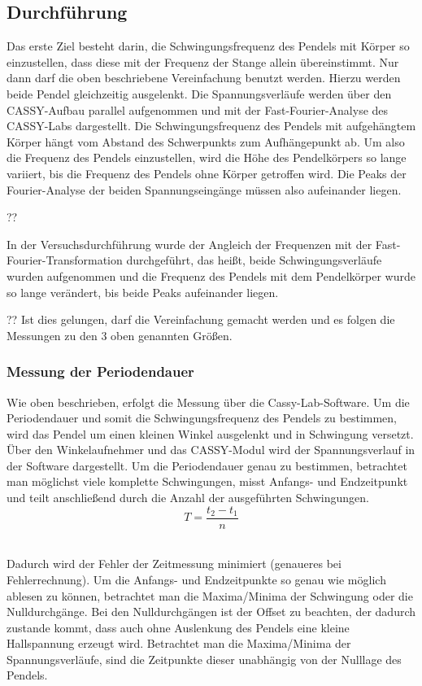 \documentclass[a4paper, 11pt]{article}
\begin{document}
\subsection{Durchführung}
Das erste Ziel besteht darin, die Schwingungsfrequenz des Pendels mit Körper so einzustellen, dass diese mit der Frequenz der Stange allein übereinstimmt. Nur dann darf die oben beschriebene Vereinfachung benutzt werden.
Hierzu werden beide Pendel gleichzeitig ausgelenkt. Die Spannungsverläufe werden über den CASSY-Aufbau parallel aufgenommen und mit der Fast-Fourier-Analyse des CASSY-Labs dargestellt. Die Schwingungsfrequenz des Pendels mit aufgehängtem Körper hängt vom Abstand des Schwerpunkts zum Aufhängepunkt ab. Um also die Frequenz des Pendels einzustellen, wird die Höhe des Pendelkörpers so lange variiert, bis die Frequenz des Pendels ohne Körper getroffen wird. Die Peaks der Fourier-Analyse der beiden Spannungseingänge müssen also aufeinander liegen. 

??

In der Versuchsdurchführung wurde der Angleich der Frequenzen mit der Fast-Fourier-Transformation durchgeführt, das heißt, beide Schwingungsverläufe wurden aufgenommen und die Frequenz des Pendels mit dem Pendelkörper wurde so lange verändert, bis beide Peaks aufeinander liegen. 

??
Ist dies gelungen, darf die Vereinfachung gemacht werden und es folgen die Messungen zu den 3 oben genannten Größen.
\newpage

\subsubsection{Messung der Periodendauer}
Wie oben beschrieben, erfolgt die Messung über die Cassy-Lab-Software. Um die Periodendauer und somit die Schwingungsfrequenz des Pendels zu bestimmen, wird das Pendel um einen kleinen Winkel ausgelenkt und in Schwingung versetzt. Über den Winkelaufnehmer und das CASSY-Modul wird der Spannungsverlauf in der Software dargestellt. Um die Periodendauer genau zu bestimmen, betrachtet man möglichst viele komplette Schwingungen, misst Anfangs- und Endzeitpunkt und teilt anschließend durch die Anzahl der ausgeführten Schwingungen.
\begin{equation*}
T = \frac{t_2-t_1}{n}
\end{equation*}\

Dadurch wird der Fehler der Zeitmessung minimiert (genaueres bei Fehlerrechnung). Um die Anfangs- und Endzeitpunkte so genau wie möglich ablesen zu können, betrachtet man die Maxima/Minima der Schwingung oder die Nulldurchgänge. Bei den Nulldurchgängen ist der Offset zu beachten, der dadurch zustande kommt, dass auch ohne Auslenkung des Pendels eine kleine Hallspannung erzeugt wird. Betrachtet man die Maxima/Minima der Spannungsverläufe, sind die Zeitpunkte dieser unabhängig von der Nulllage des Pendels. \\
\end{document}
